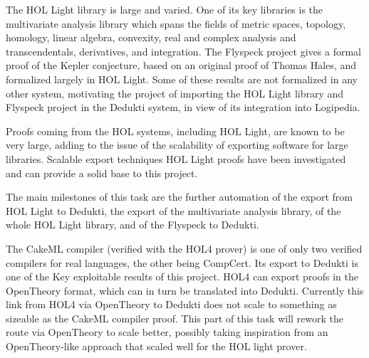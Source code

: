 \begin{workpackage}[id=libraries,type=RTD,wphases=1-48,
  short={Large libraries},%
  title={Large libraries},
  activity=na,
  lead=Tum,
  StrRM=18,
  ChaRM=12,
  TumRM=27]
\begin{tasklist}
\begin{task}[
  id=flyspeck,
  title=The Flyspeck library,
  shorttitle=Flyspeck,
  lead=Inr,
  wphases=1-36]
The {HOL Light} library is large and varied. One of its key libraries is the
multivariate analysis library
which spans the fields of metric spaces, topology, homology, linear algebra,
convexity, real and complex analysis and transcendentals, derivatives, and
integration. The {Flyspeck} project gives a formal proof of the {Kepler}
conjecture, based on an original proof of Thomas {Hales}, and formalized
largely in {HOL Light}.%
Some of these results are not formalized in any other system, motivating the
project of importing the {HOL Light} library and {Flyspeck} project in the
{Dedukti} system, in view of its integration into {Logipedia}.

Proofs coming from the HOL systems, including HOL Light, are known
to be very large, adding to the issue of the scalability of exporting
software for large libraries. Scalable export techniques HOL Light
proofs have been investigated and can provide a solid base to this
project.

The main milestones of this task are the further automation of the export from
{HOL Light} to {Dedukti}, the export of the multivariate analysis library, of
the whole {HOL Light} library, and of the {Flyspeck} to {Dedukti}.
\end{task}

\begin{task}[
  id=cakeml,
  title=The CakeML compiler library,
  shorttitle=CakeML,
  lead=Cha,
  ChaRM=12,
  wphases=12-23]
%
The CakeML
compiler 
(verified with the HOL4 prover) is one of only two verified compilers for real
languages, the other being CompCert. Its export to Dedukti is one of
the Key exploitable results of this project.
%
HOL4 can export proofs in the OpenTheory format, which can in turn be
translated into Dedukti. Currently this link from HOL4 via OpenTheory
to Dedukti does not scale to something as sizeable as the CakeML
compiler proof. This part of this task will rework the route via
OpenTheory to scale better, possibly taking inspiration from an
OpenTheory-like approach that scaled well for the HOL light
prover.


\end{task}
\end{tasklist}
\end{workpackage}
